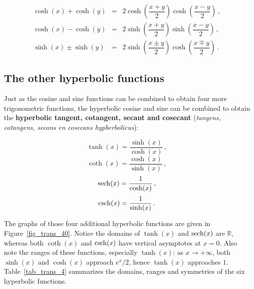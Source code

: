 
\begin{eqnarray}
\cosh(x) + \cosh(y) &=& 2 \cosh\left( \dfrac{x + y}{2}\right)\cosh\left( \dfrac{x - y}{2}\right)\,,\\[0.2cm]
\cosh(x) -  \cosh(y) &=&  2 \sinh\left( \dfrac{x + y}{2}\right)\sinh\left( \dfrac{x - y}{2}\right)\,,\\[0.2cm]
\sinh(x) \pm \sinh(y) &=& 2 \sinh\left( \dfrac{x \pm y}{2}\right)\cosh\left( \dfrac{x \mp y}{2}\right)\,.
\end{eqnarray}

\subsection{The other hyperbolic functions}
Just as the cosine and sine functions can be combined to obtain four more trigonometric functions, the hyperbolic cosine and sine can be combined to obtain the \textbf{hyperbolic tangent, cotangent, secant and cosecant} (\textit{tangens, cotangens, secans en cosecans hypberbolicus}):

\begin{equation}
\tanh(x) = \dfrac{\sinh(x)}{\cosh(x)}\,,
\label{tanh}
\end{equation}
\begin{equation}
\coth(x) = \dfrac{\cosh(x)}{\sinh(x)}\,,
\label{coth}
\end{equation}
\begin{equation}
\operatorname{sech}(x) = \dfrac{1}{\cosh(x)}\,,
\label{sech}
\end{equation}
\begin{equation}
\operatorname{csch}(x) = \dfrac{1}{\sinh(x)}\,.
\label{csch}
\end{equation}

The graphs of those four additional hyperbolic functions are given in Figure~\ref{fig_trans_40}. Notice the domains of $\tanh(x)$ and $\operatorname{sech}(x)$ are $\mathbb{R}$, whereas both $\coth(x)$ and $\operatorname{csch}(x)$ have vertical asymptotes at $x=0$. Also note the ranges of these functions, especially $\tanh(x)$: as $x\to+\infty$, both $\sinh(x)$ and $\cosh(x)$ approach $e^{x}/2$, hence $\tanh(x)$ approaches $1$. Table~\ref{tab_trans_4} summarizes the domains, ranges and symmetries of the six hyperbolic functions. 


